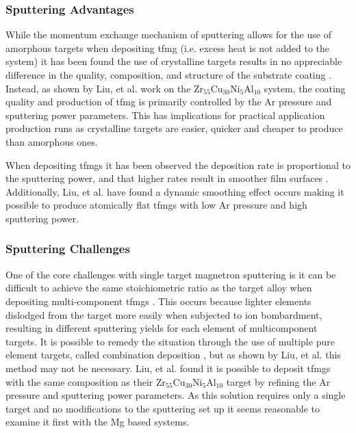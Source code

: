 \documentclass[a4paper,12pt,oneside]{report}%
\begin{document}
\subsubsection{Sputtering Advantages}
While the momentum exchange mechanism of sputtering allows for the use of amorphous targets when depositing \gls{tfmg} (i.e. excess heat is not added to the system) it has been found the use of crystalline targets results in no appreciable difference in the quality, composition, and structure of the substrate coating  \cite{Liu2012}. Instead, as shown by Liu, et al. \cite{Liu2012} work on the Zr$_{55}$Cu$_{30}$Ni$_{5}$Al$_{10}$ system, the coating quality and production of \gls{tfmg} is primarily controlled by the Ar pressure and sputtering power parameters. This has implications for practical application production runs as crystalline targets are easier, quicker and cheaper to produce than amorphous ones. 

When depositing \glspl{tfmg} it has been observed the deposition rate is proportional to the sputtering power, and that higher rates result in smoother film surfaces \cite{Cao2013, Liu2012}. Additionally, Liu, et al. \cite{Liu2012} have found a dynamic smoothing effect occurs making it possible to produce atomically flat \glspl{tfmg} with low Ar pressure and high sputtering power. 

\subsubsection{Sputtering Challenges}
One of the core challenges with single target magnetron sputtering is it can be difficult to achieve the same stoichiometric ratio as the target alloy when depositing multi-component \glspl{tfmg} \cite{Cao2013, Liu2012, Kondoh2008}. This occurs because lighter elements dislodged from the target more easily when subjected to ion bombardment, resulting in different sputtering yields for each element of multicomponent targets. It is possible to remedy the situation through the use of multiple pure element targets, called combination deposition \cite{Deng2007, Qin2009, Apreutesei2014}, but as shown by Liu, et al. \cite{Liu2012} this method may not be necessary. Liu, et al. \cite{Liu2012} found it is possible to deposit \glspl{tfmg} with the same composition as their Zr$_{55}$Cu$_{30}$Ni$_{5}$Al$_{10}$ target by refining the Ar pressure and sputtering power parameters. As this solution requires only a single target and no modifications to the sputtering set up it seems reasonable to examine it first with the Mg based systems. 
\end{document}
